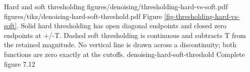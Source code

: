 {Hard and soft thresholding}
{figures/denoising/thresholding-hard-vs-soft.pdf}
{figures/tikz/denoising-hard-soft-threshold.pdf}
{Figure \ref{fig-thresholding-hard-vs-soft}.}
{Solid hard thresholding has open diagonal endpoints and closed zero endpoints at +/-T. Dashed soft thresholding is continuous and subtracts T from the retained magnitude. No vertical line is drawn across a discontinuity; both functions are zero exactly at the cutoffs.}
{denoising-hard-soft-threshold}
{Complete figure}
{7.12}

